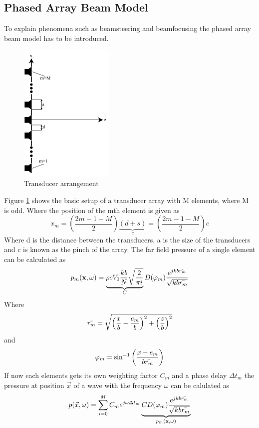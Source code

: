 \subsection{Phased Array Beam Model}
To explain phenomena such as beamsteering and beamfocusing the phased array beam model has to be introduced.
 \begin{figure}[h!]
     \centering
     \includegraphics[width=0.4\textwidth]{images/3_Parametric_array/Loudspeaker_Arangement.pdf}
     \caption{Transducer arrangement}
     \label{3_Parametric_array_img:Transducer_Model}
 \end{figure}
Figure \ref{3_Parametric_array_img:Transducer_Model} shows the basic setup of a transducer array with M elements, where M is odd. Where the position of the mth element is given as \cite{alma99116706330905515} 
\begin{equation}\label{3.4_eq:simplified_xm}
    x_m 
    = 
    \left ( \frac{2m -1 - M}{2} \right ) \underbrace{(d + s)}_{c}
    =
    \left ( \frac{2m -1 - M}{2} \right ) c
\end{equation}
Where d is the distance between the transducers, a is the size of the transducers and c is known as the pinch of the array. 
The far field pressure of a single element can be calculated as \cite{alma99116706330905515}
\begin{equation}
    p_m(\textbf{x},\omega) 
    =
    \underbrace{\rho c V_0 \frac{k b}{N} \sqrt{\frac{2}{\pi i}}}_{C} D(\varphi_{m}) \frac{e^{j k b \Bar{r_m}}}{\sqrt{k b \Bar{r_m}}}  
\end{equation}
Where
\begin{equation}
    \Bar{r_m} 
    = 
    \sqrt{\left ( \frac{x}{b} - \frac{e_m}{b}\right )^2 + \left ( \frac{z}{b} \right )^2}
\end{equation}
and 
\begin{equation}
    \varphi_m = \sin^{-1}{\left ( \frac{x - e_m}{b \Bar{r_m}} \right )}
\end{equation}
If now each elements gets its own weighting factor $C_m$ and a phase delay $\Delta t_m$ the pressure at position $\Vec{x}$ of a wave with the frequency $\omega$ can be calulated as 
\begin{equation}
    p(\Vec{x},\omega) 
    = 
    \sum_{i=0}^M C_m e^{j\omega \Delta t_m} \underbrace{C D(\varphi_{m}) \frac{e^{j k b \Bar{r_m}}}{\sqrt{k b \Bar{r_m}}}}_{ p_m(\textbf{x},\omega)} 
\end{equation}
